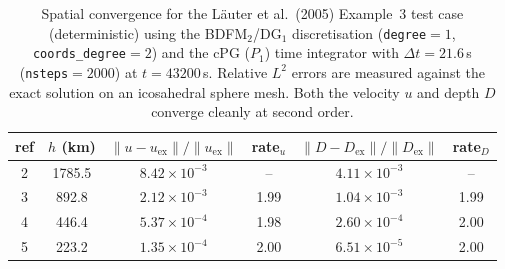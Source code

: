 \begin{table}[htbp]
  \centering
  \begin{tabular}{c c c c c c}
    \toprule
    ref & $h$ (km) & $\|u-u_{\mathrm{ex}}\|/\|u_{\mathrm{ex}}\|$ & rate$_u$
        & $\|D-D_{\mathrm{ex}}\|/\|D_{\mathrm{ex}}\|$ & rate$_D$ \\
    \midrule
    2 & 1785.5 & $8.42\times10^{-3}$ & --   & $4.11\times10^{-3}$ & --   \\
    3 &  892.8 & $2.12\times10^{-3}$ & 1.99 & $1.04\times10^{-3}$ & 1.99 \\
    4 &  446.4 & $5.37\times10^{-4}$ & 1.98 & $2.60\times10^{-4}$ & 2.00 \\
    5 &  223.2 & $1.35\times10^{-4}$ & 2.00 & $6.51\times10^{-5}$ & 2.00 \\
    \bottomrule
  \end{tabular}
  \caption{Spatial convergence for the Läuter et al.\ (2005) Example~3 test case
    (deterministic) using the BDFM$_2$/DG$_1$ discretisation (\texttt{degree}$=1$,
    \texttt{coords\_degree}$=2$) and the cPG ($P_1$) time integrator with
    $\Delta t = 21.6$\,s (\texttt{nsteps}$=2000$) at $t = 43200$\,s. Relative $L^2$ errors
    are measured against the exact solution on an icosahedral sphere mesh. Both the
    velocity $u$ and depth $D$ converge cleanly at second order.}
  \label{tab:lauter-spatial-bdfm}
\end{table}
